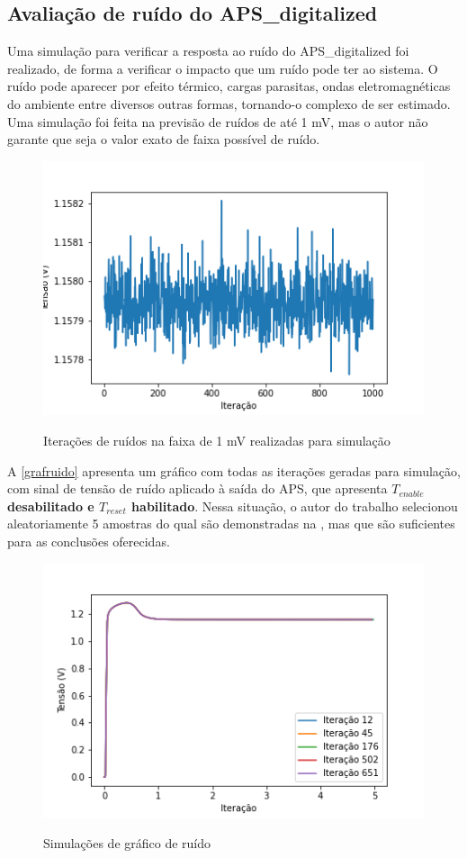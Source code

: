 \subsection{Avaliação de ruído do APS\_digitalized}

Uma simulação para verificar a resposta ao ruído do APS\_digitalized foi realizado, de forma a verificar o impacto que um ruído pode ter ao sistema. O ruído pode aparecer por efeito térmico, cargas parasitas, ondas eletromagnéticas do ambiente entre diversos outras formas, tornando-o complexo de ser estimado. Uma simulação foi feita na previsão de ruídos de até 1 mV, mas o autor não garante que seja o valor exato de faixa possível de ruído.

\begin{figure}[htb]
 \centering
    \caption{Iterações de ruídos na faixa de 1 mV realizadas para simulação} 
    \includegraphics[scale=1]{Resultados/Graficos/ruido-Vout_noise.png}
    \label{grafruido}
\end{figure}

A \autoref{grafruido} apresenta um gráfico com todas as iterações geradas para simulação, com sinal de tensão de ruído aplicado à saída do APS, que apresenta \textbf{$T_{enable}$ desabilitado e $T_{reset}$ habilitado}. Nessa situação, o autor do trabalho selecionou aleatoriamente 5 amostras do qual são demonstradas na , mas que são suficientes para as conclusões oferecidas.

\begin{figure}[htb]
 \centering
    \caption{Simulações de gráfico de ruído} 
    \includegraphics[scale=1]{Resultados/Graficos/tb_pixel_TRAN_NOISE.png}
    \label{grafruido2}
\end{figure}

